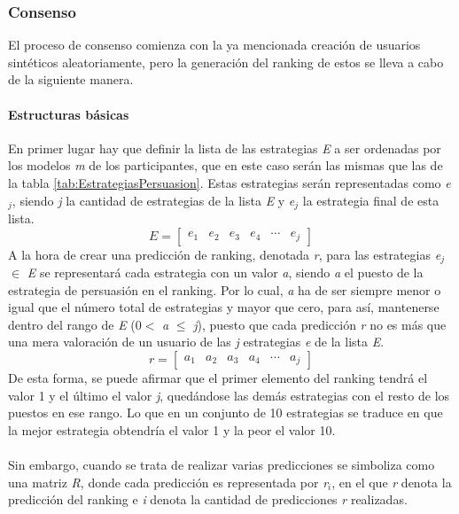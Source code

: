 \subsubsection{Consenso}
El proceso de consenso comienza con la ya mencionada creación de usuarios sintéticos aleatoriamente, pero la generación del ranking de estos se lleva a cabo de la siguiente manera.

\paragraph{Estructuras básicas} En primer lugar hay que definir la lista de las estrategias \textit{E} a ser ordenadas por los modelos \textit{m} de los participantes, que en este caso serán las mismas que las de la tabla \ref{tab:EstrategiasPersuasion}. Estas estrategias serán representadas como \textit{e$_{j}$}, siendo \textit{j} la cantidad de estrategias de la lista \textit{E} y \textit{e$_{j}$} la estrategia final de esta lista. 
\[
    \textit{E} = \begin{bmatrix} \textit{e$_{1}$} & \textit{e$_{2}$} & \textit{e$_{3}$} & \textit{e$_{4}$} & \cdots & \textit{e$_{j}$} \end{bmatrix}
\]
A la hora de crear una predicción de ranking, denotada \textit{r}, para las estrategias \textit{e$_j$} $\in$ \textit{E} se representará cada estrategia con un valor \textit{a}, siendo \textit{a} el puesto de la estrategia de persuasión en el ranking. Por lo cual, \textit{a} ha de ser siempre menor o igual que el número total de estrategias y mayor que cero, para así, mantenerse dentro del rango de \textit{E} (0$<$
\textit{a }$\leq$\textit{ j}), puesto que cada predicción \textit{r} no es más que una mera valoración de un usuario de las \textit{j} estrategias \textit{e} de la lista \textit{E}.
\[
    \textit{r} = \begin{bmatrix} \textit{a$_{1}$} & \textit{a$_{2}$} & \textit{a$_{3}$} & \textit{a$_{4}$} & \cdots & \textit{a$_{j}$} \end{bmatrix}
\]
De esta forma, se puede afirmar que el primer elemento del ranking tendrá el valor 1 y el último el valor \textit{j}, quedándose las demás estrategias con el resto de los puestos en ese rango. Lo que en un conjunto de 10 estrategias se traduce en que la mejor estrategia obtendría el valor 1 y la peor el valor 10.
\\ \\
Sin embargo, cuando se trata de realizar varias predicciones se simboliza como una matriz \textit{R}, donde cada predicción es representada por \textit{r$_{i}$}, en el que \textit{r} denota la predicción del ranking  e \textit{i} denota la cantidad de predicciones \textit{r} realizadas.
